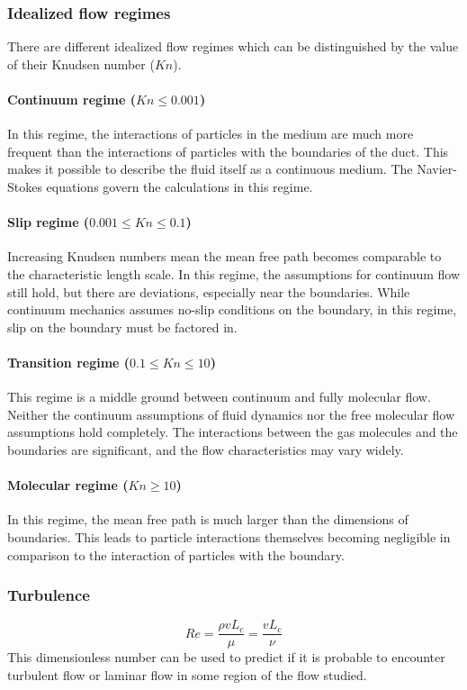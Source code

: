\subsubsection{Idealized flow regimes}
There are different idealized flow regimes which can be distinguished by the value of their Knudsen number (\(Kn\)).

\paragraph{Continuum regime (\(Kn \leq 0.001\))}
In this regime, the interactions of particles in the medium are much more frequent than the interactions of particles with the boundaries of the duct. This makes it possible to describe the fluid itself as a continuous medium. The Navier-Stokes equations govern the calculations in this regime.

\paragraph{Slip regime (\(0.001 \leq Kn \leq 0.1\))}
Increasing Knudsen numbers mean the mean free path becomes comparable to the characteristic length scale. In this regime, the assumptions for continuum flow still hold, but there are deviations, especially near the boundaries. While continuum mechanics assumes no-slip conditions on the boundary, in this regime, slip on the boundary must be factored in.

\paragraph{Transition regime (\(0.1 \leq Kn \leq 10\))}
This regime is a middle ground between continuum and fully molecular flow. Neither the continuum assumptions of fluid dynamics nor the free molecular flow assumptions hold completely. The interactions between the gas molecules and the boundaries are significant, and the flow characteristics may vary widely.

\paragraph{Molecular regime (\(Kn \geq 10\))}
In this regime, the mean free path is much larger than the dimensions of boundaries. This leads to particle interactions themselves becoming negligible in comparison to the interaction of particles with the boundary.

\newpage
\subsubsection{Turbulence}
$$
Re = \frac{\rho v L_c}{\mu} = \frac{v L_c}{\nu}
$$
This dimensionless number can be used to predict if it is probable to encounter turbulent flow or laminar flow in some region of the flow studied.
